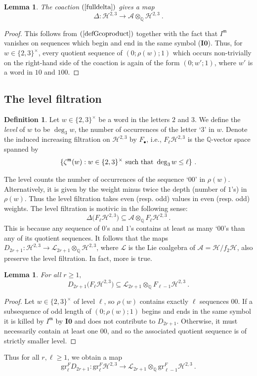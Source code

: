 \documentclass[10pt]{amsart}
\newtheorem{lem}[thm]{Lemma}
\theoremstyle{definition}
\newtheorem{defn}[thm]{Definition}
\theoremstyle{remark}
\numberwithin{equation}{section}
\newcommand{\gr}{\mathrm{gr}}
\newcommand{\Ho}{\mathcal{H}}
\newcommand{\Ao}{\mathcal{A}}
\newcommand{\Io}{\mathbf{I0}}
\newcommand{\zetam}{\zeta^{ \mathfrak{m}}}
\newcommand{\Imot}{I^{\mathfrak{m}}}
\newcommand{\Q}{\mathbb Q}
\newcommand{\Lo}{\mathcal{L}}
\newcommand{\To}{\longrightarrow}
\begin{document}
\begin{lem} The coaction $(\ref{fulldelta})$   gives a map
$$\Delta: \Ho^{2,3} \To \mathcal{A} \otimes_{\Q} \Ho^{2,3}\ .$$
\end{lem}
\begin{proof}
This follows from $(\ref{defGcoproduct})$ together with  the fact that  $\Imot$ vanishes on sequences which begin and end in the same symbol ($\Io$). Thus, for  $w\in \{2,3\}^{\times}$,
every  quotient sequence of $(0;\rho(w);1)$ which occurs non-trivially on the right-hand side of  the coaction   is  again of the form $(0;w';1)$,  where $w'$ is   a word in $10$ and $100$.
\end{proof}

\subsection{ The level filtration}


\begin{defn} Let $w\in \{2,3\}^{\times}$ be a word in the letters $2$ and $3$. We define  the  \emph{level} of $w$ to be $\deg_3 w$, the number of occurrences of the letter `3' in $w$. 
Denote the induced increasing filtration on $\Ho^{2,3}$ by  $F_{\bullet}$, i.e., $F_{\ell}\Ho^{2,3}$ is the $\Q$-vector space spanned by
 $$ \{ \zetam(w): w\in \{2,3\}^\times \hbox{ such that }  \deg_3 w\leq \ell\} \ .$$ 
\end{defn}

The level  counts the number of occurrences  of the sequence  `$00$' in $\rho(w)$.
Alternatively, it is  given by the weight minus twice the depth (number of $1$'s) in $\rho(w)$. Thus the level filtration   takes even (resp. odd) values in even (resp. odd) weights. 
 The level filtration  is motivic in the following sense:
$$\Delta \big( F_{\ell} \Ho^{2,3} \big)  \subseteq  \mathcal{A}\otimes_{\Q} F_{\ell}\Ho^{2,3} \ .$$
This is because any sequence of $0$'s and $1$'s contains  at least as many   `$00$'s  than any of   its quotient sequences.
 It follows that  the maps $D_{2r+1} :\Ho^{2,3} \rightarrow \Lo_{2r+1}\otimes_{\Q} \Ho^{2,3}$, where $\Lo$ is the Lie coalgebra of $\Ao=\Ho/f_2\Ho$, also preserve the level filtration. In fact, more is true.
 \begin{lem}  \label{lemdroplevel} For all $r\geq 1,$ 
$$  D_{2r+1} \big( F_\ell \Ho^{2,3} \big) \subseteq \Lo_{2r+1}\otimes_{\Q} F_{\ell-1} \Ho^{2,3} \ .$$
\end{lem}
\begin{proof} Let $w\in \{2,3\}^\times$ of level $\ell$, so $\rho(w)$ contains exactly $\ell$ sequences $00$.   If a subsequence of odd length of $(0;\rho(w);1)$
begins and ends in the same symbol it is killed by $\Imot$ by $\Io$ and does not contribute to $D_{2r+1}$. Otherwise,  it must necessarily contain at least one $00$, and so the associated quotient sequence is  of strictly smaller level. 
\end{proof}
Thus for all $r,\ell \geq 1$,  we obtain a map
\begin{equation} \label{grFin5pt1}
\gr^F_{\ell} D_{2r+1}: \gr^F_{\ell} \Ho^{2,3} \To \Lo_{2r+1} \otimes_{\Q} \gr^F_{\ell-1} \Ho^{2,3}\ .
\end{equation}
\end{document}
